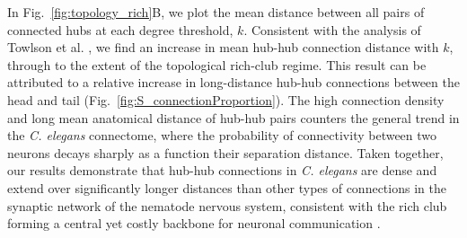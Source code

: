 \documentclass[10pt,letterpaper]{article}
\begin{document}

In Fig.~\ref{fig:topology_rich}B, we plot the mean distance between all pairs of connected hubs at each degree threshold, $k$.
Consistent with the analysis of Towlson et al. \cite{Towlson:2013gf}, we find an increase in mean hub-hub connection distance with $k$, through to the extent of the topological rich-club regime.
This result can be attributed to a relative increase in long-distance hub-hub connections between the head and tail (Fig.~\ref{fig:S_connectionProportion}).
The high connection density and long mean anatomical distance of hub-hub pairs counters the general trend in the \emph{C. elegans} connectome, where the probability of connectivity between two neurons decays sharply as a function their separation distance.
Taken together, our results demonstrate that hub-hub connections in \emph{C. elegans} are dense and extend over significantly longer distances than other types of connections in the synaptic network of the nematode nervous system, consistent with the rich club forming a central yet costly backbone for neuronal communication \cite{vandenHeuvel:2012kh}.

\end{document}
